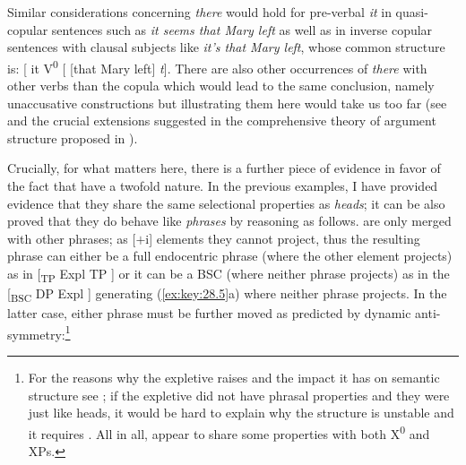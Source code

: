 \documentclass[output=paper]{langsci/langscibook}
\begin{document}
Similar considerations concerning \emph{there} would hold for pre-verbal
\emph{it} in quasi-copular sentences such as \emph{it seems that Mary left} as
well as in inverse copular sentences with clausal subjects like \emph{it's that
Mary left}, whose common structure is: [ it V\textsuperscript{0} [ [that Mary
left] \emph{t}]. There are also other occurrences of \emph{there} with other
verbs than the copula which would lead to the same conclusion, namely
unaccusative constructions but illustrating them here would take us too far
(see \citealt{Moro1997} and the crucial extensions suggested in the
comprehensive theory of argument structure proposed in
\citealt{HaleKeyser2002}).

Crucially, for what matters here, there is a further piece of evidence in favor
of the fact that  have a twofold nature. In the previous examples, I
have provided evidence that they share the same selectional properties as
\emph{heads}; it can be also proved that they do behave like \emph{phrases} by
reasoning as follows.  are only merged with other phrases; as [$+$i]
elements they cannot project, thus the resulting phrase can either be a full
endocentric phrase (where the other element projects) as in [\textsubscript{TP}
Expl TP ] or it can be a \gls{BSC} (where neither phrase projects) as in the
[\textsubscript{BSC} DP Expl ] generating (\ref{ex:key:28.5}a) where neither
phrase projects. In the latter case, either phrase must be further moved as
predicted by dynamic anti-symmetry\@:\footnote{For the reasons why the expletive
    raises and the impact it has on semantic structure see
    \textcites[Ch.\ 3]{Moro1997}{Moro2000}{Moro2009};
    \citet{Chomsky2013,Chomsky2017,ChoGalOtt2019,Rizzi2015,Rizzi2016}
    if the expletive did not have phrasal properties and they were just like
    heads, it would be hard to explain why the structure is unstable and it
requires . All in all,  appear to share some properties with
both X\textsuperscript{0} and XPs.}
\end{document}
